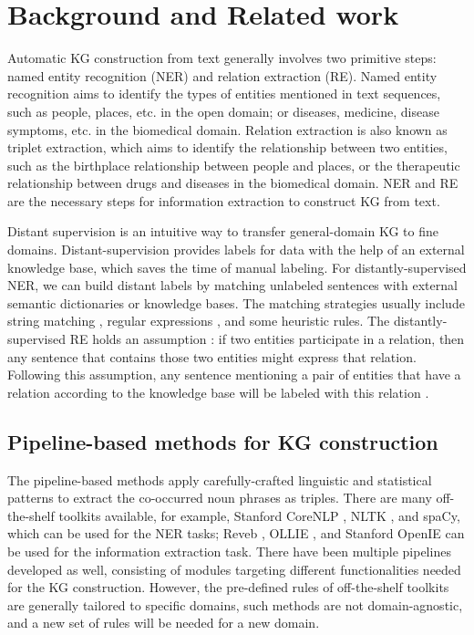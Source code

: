 \documentclass[sigconf]{acmart}
\begin{document}
\section{Background and Related work}
Automatic KG construction from text generally involves two primitive steps: named entity recognition (NER) and relation extraction (RE). Named entity recognition aims to identify the types of entities mentioned in text sequences, such as people, places, etc. in the open domain; or diseases, medicine, disease symptoms, etc. in the biomedical domain. Relation extraction is also known as triplet extraction, which aims to identify the relationship between two entities, such as the birthplace relationship between people and places, or the therapeutic relationship between drugs and diseases in the biomedical domain. NER and RE are the necessary steps for information extraction to construct KG from text. 

Distant supervision \cite{smirnova2018relation} is an intuitive way to transfer general-domain KG to fine domains. Distant-supervision provides labels for data with the help of an external knowledge base, which saves the time of manual labeling. For distantly-supervised NER, we can build distant labels by matching unlabeled sentences with external semantic dictionaries or knowledge bases. The matching strategies usually include string matching \cite{zhao2019construction}, regular expressions \cite{fries2017swellshark}, and some heuristic rules. The distantly-supervised RE holds an assumption \cite{mintz2009distant}: if two entities participate in a relation, then any sentence that contains those two entities might express that relation. Following this assumption, any sentence mentioning a pair of entities that have a relation according to the knowledge base will be labeled with this relation \cite{smirnova2018relation}. 
\subsection{Pipeline-based methods for KG construction}
The pipeline-based methods apply carefully-crafted linguistic and statistical patterns to extract the co-occurred noun phrases as triples. There are many off-the-shelf  toolkits available, for example, Stanford CoreNLP \cite{manning2014stanford}, NLTK \cite{thanaki2017python}, and spaCy, which can be used for the NER tasks; Reveb \cite{fader2011identifying}, OLLIE \cite{schmitz2012open}, and Stanford OpenIE \cite{angeli2015leveraging} can be used for the information extraction task. There have been multiple pipelines \cite{mehta2019scalable,rossanez2020kgen} developed as well, consisting of modules targeting different functionalities needed for the KG construction.  However, the pre-defined rules of off-the-shelf  toolkits are generally tailored to specific domains, such methods are not domain-agnostic, and a new set of rules will be needed for a new domain. 
\end{document}
